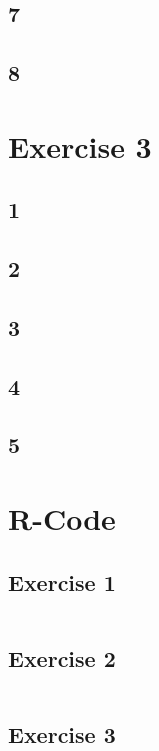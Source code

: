 \documentclass{article}
\begin{document}
    \subsection*{7}
    
    \subsection*{8}

  \section*{Exercise 3}
    \subsection*{1}
    \subsection*{2}
    \subsection*{3}
    \subsection*{4}
    \subsection*{5}
    
  \section{R-Code}
    \subsection{Exercise 1}\label{sec:RE1}
      \begin{lstlisting}[language=R]
      \end{lstlisting}
    \subsection{Exercise 2}\label{sec:RE2}
      \begin{lstlisting}[language=R]
      \end{lstlisting}
    \subsection{Exercise 3}\label{sec:RE3}
      \begin{lstlisting}[language=R]
      \end{lstlisting}
\end{document}
